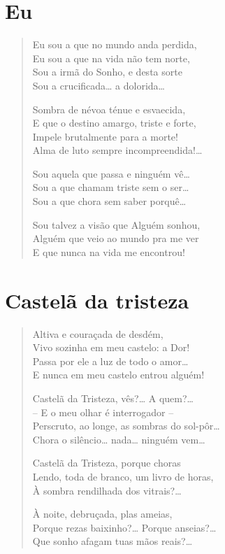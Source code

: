 \chapter{Eu}

\begin{verse}
Eu sou a que no mundo anda perdida,\\
Eu sou a que na vida não tem norte,\\
Sou a irmã do Sonho, e desta sorte\\
Sou a crucificada\ldots{} a dolorida\ldots{}  

Sombra de névoa ténue e esvaecida,\\
E que o destino amargo, triste e forte,\\
Impele brutalmente para a morte!\\
Alma de luto sempre incompreendida!\ldots{}  

Sou aquela que passa e ninguém vê\ldots{}\\
Sou a que chamam triste sem o ser\ldots{}\\
Sou a que chora sem saber porquê\ldots{}  

Sou talvez a visão que Alguém sonhou,\\
Alguém que veio ao mundo pra me ver\\
E que nunca na vida me encontrou! 
\end{verse}

\chapter{Castelã da tristeza}

\begin{verse}
Altiva e couraçada de desdém,\\
Vivo sozinha em meu castelo: a Dor!\\
Passa por ele a luz de todo o amor\ldots{}\\
E nunca em meu castelo entrou alguém!

Castelã da Tristeza, vês?\ldots{} A quem?\ldots{}\\
– E o meu olhar é interrogador –\\
Perscruto, ao longe, as sombras do sol-pôr\ldots{}\\
Chora o silêncio\ldots{}  nada\ldots{}  ninguém vem\ldots{}

Castelã da Tristeza, porque choras\\
Lendo, toda de branco, um livro de horas,\\
À sombra rendilhada dos vitrais?\ldots{}

À noite, debruçada, plas ameias,\\
Porque rezas baixinho?\ldots{} Porque anseias?\ldots{}\\
Que sonho afagam tuas mãos reais?\ldots{}
\end{verse}

